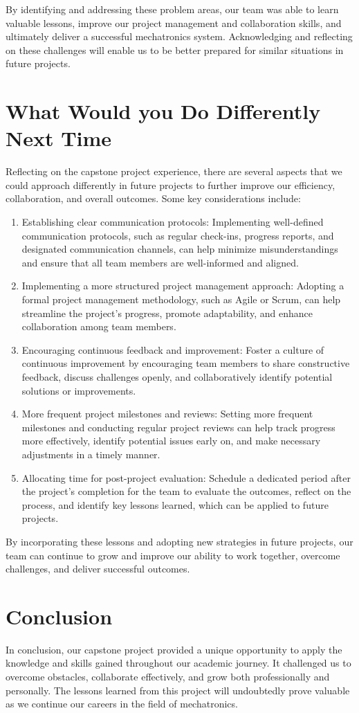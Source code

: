 \documentclass{article}
\begin{document}
By identifying and addressing these problem areas, our team was able to learn valuable lessons, improve our project management and collaboration skills, and ultimately deliver a successful mechatronics system. Acknowledging and reflecting on these challenges will enable us to be better prepared for similar situations in future projects.
\section{What Would you Do Differently Next Time}
Reflecting on the capstone project experience, there are several aspects that we could approach differently in future projects to further improve our efficiency, collaboration, and overall outcomes. Some key considerations include:
\begin{enumerate}
    \item Establishing clear communication protocols: Implementing well-defined communication protocols, such as regular check-ins, progress reports, and designated communication channels, can help minimize misunderstandings and ensure that all team members are well-informed and aligned.
    \item Implementing a more structured project management approach: Adopting a formal project management methodology, such as Agile or Scrum, can help streamline the project's progress, promote adaptability, and enhance collaboration among team members.
    \item Encouraging continuous feedback and improvement: Foster a culture of continuous improvement by encouraging team members to share constructive feedback, discuss challenges openly, and collaboratively identify potential solutions or improvements.
    \item More frequent project milestones and reviews: Setting more frequent milestones and conducting regular project reviews can help track progress more effectively, identify potential issues early on, and make necessary adjustments in a timely manner.
    \item Allocating time for post-project evaluation: Schedule a dedicated period after the project's completion for the team to evaluate the outcomes, reflect on the process, and identify key lessons learned, which can be applied to future projects.
\end{enumerate}
By incorporating these lessons and adopting new strategies in future projects, our team can continue to grow and improve our ability to work together, overcome challenges, and deliver successful outcomes.
\section{Conclusion}
In conclusion, our capstone project provided a unique opportunity to apply the knowledge and skills gained throughout our academic journey. It challenged us to overcome obstacles, collaborate effectively, and grow both professionally and personally. The lessons learned from this project will undoubtedly prove valuable as we continue our careers in the field of mechatronics.
\end{document}
